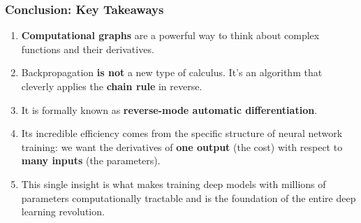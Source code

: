 \documentclass[xcolor=svgnames, 10pt, handout]{beamer}
\begin{document}
\begin{frame}
\frametitle{Conclusion: Key Takeaways}

\begin{enumerate}
    \item \textbf{Computational graphs} are a powerful way to think about complex functions and their derivatives.
    \vspace{0.5cm}
    \item Backpropagation \textbf{is not} a new type of calculus. It's an algorithm that cleverly applies the \textbf{chain rule} in reverse.
    \vspace{0.5cm}
    \item It is formally known as \textbf{reverse-mode automatic differentiation}.
    \vspace{0.5cm}
    \item Its incredible efficiency comes from the specific structure of neural network training: we want the derivatives of \textbf{one output} (the cost) with respect to \textbf{many inputs} (the parameters).
    \vspace{0.5cm}
    \item This single insight is what makes training deep models with millions of parameters computationally tractable and is the foundation of the entire deep learning revolution.
\end{enumerate}

\end{frame}
\end{document}
